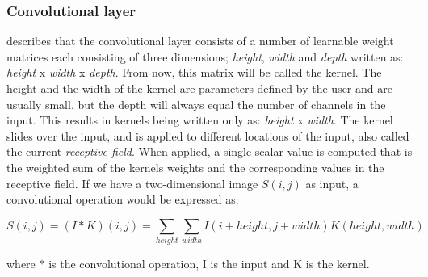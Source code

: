     \subsubsection{Convolutional layer}
     \citeauthor{o2015introduction_convolutions}\cite{o2015introduction_convolutions} describes that the convolutional layer consists of a number of learnable  weight matrices each consisting of three dimensions; \textit{height}, \textit{width} and \textit{depth} written as: \textit{height} x \textit{width} x \textit{depth}. From now, this matrix will be called the kernel. The height and the width of the kernel are parameters defined by the user and are usually small, but the depth will always equal the number of channels in the input. This results in kernels being written only as: \textit{height} x \textit{width}. The kernel slides over the input, and is applied to different locations of the input, also called the current \textit{receptive field}. When applied, a single scalar value is computed that is the weighted sum of the kernels weights and the corresponding values in the receptive field. If we have a two-dimensional image $S(i,j)$ as input, a convolutional operation would be expressed as\cite{Goodfellow-et-al-2016_convolution}:
     
        \begin{equation}
            S(i,j) = (I*K)(i,j) = \sum_{height}\sum_{width}I(i+height,j+width)K(height,width)
        \end{equation}
     
     where $*$ is the convolutional operation, I is the input and K is the kernel.
     
